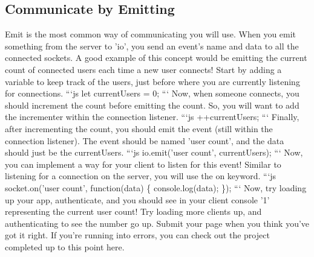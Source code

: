 \documentclass{article}%
\begin{document}
\subsection{Communicate by Emitting}%
\label{subsec:CommunicatebyEmitting}%
Emit is the most common way of communicating you will use. When you emit something from the server to 'io', you send an event's name and data to all the connected sockets. A good example of this concept would be emitting the current count of connected users each time a new user connects!\newline%
Start by adding a variable to keep track of the users, just before where you are currently listening for connections.\newline%
```js\newline%
let currentUsers = 0;\newline%
```\newline%
Now, when someone connects, you should increment the count before emitting the count. So, you will want to add the incrementer within the connection listener.\newline%
```js\newline%
++currentUsers;\newline%
```\newline%
Finally, after incrementing the count, you should emit the event (still within the connection listener). The event should be named 'user count', and the data should just be the currentUsers.\newline%
```js\newline%
io.emit('user count', currentUsers);\newline%
```\newline%
Now, you can implement a way for your client to listen for this event! Similar to listening for a connection on the server, you will use the on keyword.\newline%
```js\newline%
socket.on('user count', function(data) \{\newline%
  console.log(data);\newline%
\});\newline%
```\newline%
Now, try loading up your app, authenticate, and you should see in your client console '1' representing the current user count! Try loading more clients up, and authenticating to see the number go up.\newline%
Submit your page when you think you've got it right. If you're running into errors, you can check out the project completed up to this point here.\newline%
\end{document}
